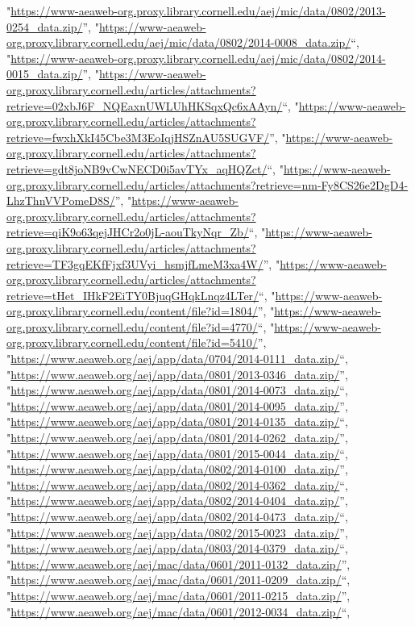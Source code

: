 \documentclass[]{article}
\begin{document}
\begin{itemize}
  "\url{https://www-aeaweb-org.proxy.library.cornell.edu/aej/mic/data/0802/2013-0254_data.zip/}'',
  "\url{https://www-aeaweb-org.proxy.library.cornell.edu/aej/mic/data/0802/2014-0008_data.zip/}``,
  "\url{https://www-aeaweb-org.proxy.library.cornell.edu/aej/mic/data/0802/2014-0015_data.zip/}'',
  "\url{https://www-aeaweb-org.proxy.library.cornell.edu/articles/attachments?retrieve=02xbJ6F_NQEaxnUWLUhHKSqxQc6xAAyn/}``,
  "\url{https://www-aeaweb-org.proxy.library.cornell.edu/articles/attachments?retrieve=fwxhXkI45Cbe3M3EoIqjHSZnAU5SUGVF/}'',
  "\url{https://www-aeaweb-org.proxy.library.cornell.edu/articles/attachments?retrieve=gdt8joNB9vCwNECD0i5avTYx_aqHQZct/}``,
  "\url{https://www-aeaweb-org.proxy.library.cornell.edu/articles/attachments?retrieve=nm-Fy8CS26e2DgD4-LhzThnVVPomeD8S/}'',
  "\url{https://www-aeaweb-org.proxy.library.cornell.edu/articles/attachments?retrieve=qiK9o63qejJHCr2o0jL-aouTkyNqr_Zb/}``,
  "\url{https://www-aeaweb-org.proxy.library.cornell.edu/articles/attachments?retrieve=TF3gqEKfFjxf3UVyi_hsmjfLmeM3xa4W/}'',
  "\url{https://www-aeaweb-org.proxy.library.cornell.edu/articles/attachments?retrieve=tHet_IHkF2EiTY0BjuqGHqkLnqz4LTer/}``,
  "\url{https://www-aeaweb-org.proxy.library.cornell.edu/content/file?id=1804/}'',
  "\url{https://www-aeaweb-org.proxy.library.cornell.edu/content/file?id=4770/}``,
  "\url{https://www-aeaweb-org.proxy.library.cornell.edu/content/file?id=5410/}'',
  "\url{https://www.aeaweb.org/aej/app/data/0704/2014-0111_data.zip/}``,
  "\url{https://www.aeaweb.org/aej/app/data/0801/2013-0346_data.zip/}'',
  "\url{https://www.aeaweb.org/aej/app/data/0801/2014-0073_data.zip/}``,
  "\url{https://www.aeaweb.org/aej/app/data/0801/2014-0095_data.zip/}'',
  "\url{https://www.aeaweb.org/aej/app/data/0801/2014-0135_data.zip/}``,
  "\url{https://www.aeaweb.org/aej/app/data/0801/2014-0262_data.zip/}'',
  "\url{https://www.aeaweb.org/aej/app/data/0801/2015-0044_data.zip/}``,
  "\url{https://www.aeaweb.org/aej/app/data/0802/2014-0100_data.zip/}'',
  "\url{https://www.aeaweb.org/aej/app/data/0802/2014-0362_data.zip/}``,
  "\url{https://www.aeaweb.org/aej/app/data/0802/2014-0404_data.zip/}'',
  "\url{https://www.aeaweb.org/aej/app/data/0802/2014-0473_data.zip/}``,
  "\url{https://www.aeaweb.org/aej/app/data/0802/2015-0023_data.zip/}'',
  "\url{https://www.aeaweb.org/aej/app/data/0803/2014-0379_data.zip/}``,
  "\url{https://www.aeaweb.org/aej/mac/data/0601/2011-0132_data.zip/}'',
  "\url{https://www.aeaweb.org/aej/mac/data/0601/2011-0209_data.zip/}``,
  "\url{https://www.aeaweb.org/aej/mac/data/0601/2011-0215_data.zip/}'',
  "\url{https://www.aeaweb.org/aej/mac/data/0601/2012-0034_data.zip/}``,

\end{itemize}
\end{document}
